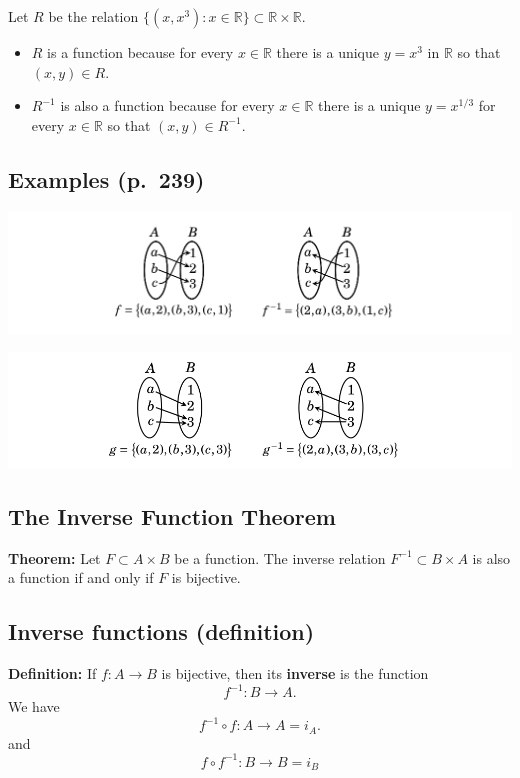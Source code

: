 \documentclass[
]{article}
\providecommand{\tightlist}{%
  \setlength{\itemsep}{0pt}\setlength{\parskip}{0pt}}
\begin{document}
Let \(R\) be the relation
\(\{(x,x^3):x\in\mathbb{R}\}\subset\mathbb{R}\times\mathbb{R}\).

\begin{itemize}
\tightlist
\item
  \(R\) is a function because for every \(x\in\mathbb{R}\) there is a
  unique \(y=x^3\) in \(\mathbb{R}\) so that \((x,y)\in R\).
\end{itemize}

\vfill

\begin{itemize}
\tightlist
\item
  \(R^{-1}\) is also a function because for every \(x\in\mathbb{R}\)
  there is a unique \(y=x^{1/3}\) for every \(x\in\mathbb{R}\) so that
  \((x,y)\in R^{-1}\).
\end{itemize}

\vfill\eject

\hypertarget{examples-p.-239}{%
\subsection{Examples (p.~239)}\label{examples-p.-239}}

\includegraphics{../../png/InverseExample1.png}

\vfill

\includegraphics{../../png/InverseExample2.png}

\vfill\eject

\hypertarget{the-inverse-function-theorem}{%
\subsection{The Inverse Function
Theorem}\label{the-inverse-function-theorem}}

\textbf{Theorem:} Let \(F\subset A\times B\) be a function. The inverse
relation \(F^{-1}\subset B\times A\) is also a function if and only if
\(F\) is bijective.

\vfill\eject

\hypertarget{inverse-functions-definition}{%
\subsection{Inverse functions
(definition)}\label{inverse-functions-definition}}

\textbf{Definition:} If \(f:A\to B\) is bijective, then its
\textbf{inverse} is the function \[f^{-1}:B\to A.\] We have \[
f^{-1}\circ f:A\to A = i_A.
\] and \[
f\circ f^{-1}:B\to B = i_B
\]
\end{document}
